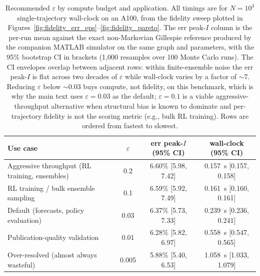 \documentclass[a4paper,fleqn]{cas-sc}
\theoremstyle{definition}
\theoremstyle{remark}
\begin{document}
\begin{table}[!h]
\caption{Recommended $\varepsilon$ by compute budget and application. All timings are for $N = 10^3$ single-trajectory wall-clock on an A100, from the fidelity sweep plotted in Figures~\ref{fig:fidelity_err_eps}--\ref{fig:fidelity_pareto}. The err peak-$I$ column is the per-run mean against the exact non-Markovian Gillespie reference produced by the companion MATLAB simulator on the same graph and parameters, with the 95\% bootstrap CI in brackets (1{,}000 resamples over 100 Monte Carlo runs). The CI envelopes overlap between adjacent rows: within finite-ensemble noise the err peak-$I$ is flat across two decades of $\varepsilon$ while wall-clock varies by a factor of $\sim$7. Reducing $\varepsilon$ below $\sim$0.03 buys compute, not fidelity, on this benchmark, which is why the main text uses $\varepsilon = 0.03$ as the default; $\varepsilon = 0.1$ is a viable aggressive-throughput alternative when structural bias is known to dominate and per-trajectory fidelity is not the scoring metric (e.g., bulk RL training). Rows are ordered from fastest to slowest.}
\label{tab:fidelity_budget}
\centering
\begin{tabular*}{\tblwidth}{@{}lccc@{}}
\toprule
\textbf{Use case}                              & $\varepsilon$ & \textbf{err peak-$I$ (95\% CI)} & \textbf{wall-clock (95\% CI)} \\
\midrule
Aggressive throughput (RL training, ensembles) & 0.2  & 6.60\% [5.98, 7.42]  & 0.157~s [0.157, 0.158] \\
RL training / bulk ensemble sampling           & 0.1  & 6.59\% [5.92, 7.49]  & 0.161~s [0.160, 0.161] \\
Default (forecasts, policy evaluation)         & 0.03 & 6.37\% [5.73, 7.33]  & 0.239~s [0.236, 0.241] \\
Publication-quality validation                 & 0.01 & 6.28\% [5.82, 6.97]  & 0.558~s [0.547, 0.565] \\
Over-resolved (almost always wasteful)         & 0.005& 5.88\% [5.40, 6.53]  & 1.058~s [1.033, 1.079] \\
\bottomrule
\end{tabular*}
\end{table}
\end{document}
